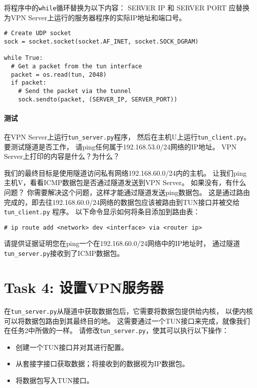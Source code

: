 将程序中的\verb|while|循环替换为以下内容： 
SERVER IP 和 SERVER PORT 应替换为VPN Server上运行的服务器程序的实际IP地址和端口号。

\begin{lstlisting}
# Create UDP socket
sock = socket.socket(socket.AF_INET, socket.SOCK_DGRAM)

while True:
  # Get a packet from the tun interface
  packet = os.read(tun, 2048)
  if packet:
    # Send the packet via the tunnel
    sock.sendto(packet, (SERVER_IP, SERVER_PORT))
\end{lstlisting}

\paragraph{测试}
在VPN Server上运行\verb|tun_server.py|程序，
然后在主机U上运行\verb|tun_client.py|。
要测试隧道是否工作，
请ping任何属于192.168.53.0/24网络的IP地址。 
VPN Server上打印的内容是什么？为什么？ 

我们的最终目标是使用隧道访问私有网络192.168.60.0/24内的主机。 
让我们ping主机V，看看ICMP数据包是否通过隧道发送到VPN Server。 
如果没有，有什么问题？ 
你需要解决这个问题，这样才能通过隧道发送ping数据包。 
这是通过路由完成的，即去往192.168.60.0/24网络的数据包应该被路由到TUN接口并被交给\verb|tun_client.py|
程序。 
以下命令显示如何将条目添加到路由表：

\begin{lstlisting}
# ip route add <network> dev <interface> via <router ip>
\end{lstlisting}

请提供证据证明您在ping一个在192.168.60.0/24网络中的IP地址时，
通过隧道\verb|tun_server.py|接收到了ICMP数据包。


\section{Task 4: 设置VPN服务器} 

在\verb|tun_server.py|从隧道中获取数据包后，它需要将数据包提供给内核，
以便内核可以将数据包路由到其最终目的地。
这需要通过一个TUN接口来完成，就像我们在任务2中所做的一样。
请修改\verb|tun_server.py|，使其可以执行以下操作：

\begin{itemize}
\item 创建一个TUN接口并对其进行配置。
\item 从套接字接口获取数据；将接收到的数据视为IP数据包。
\item 将数据包写入TUN接口。
\end{itemize}

